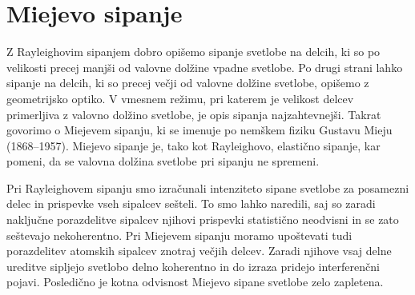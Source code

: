 % 

\section{Miejevo sipanje}
Z Rayleighovim sipanjem dobro opišemo sipanje svetlobe na delcih, ki so 
po velikosti precej manjši od valovne dolžine vpadne svetlobe. Po drugi strani lahko
sipanje na delcih, ki so precej večji od valovne dolžine svetlobe, opišemo
z geometrijsko optiko. V vmesnem režimu, pri katerem je velikost delcev 
primerljiva z valovno dolžino svetlobe, je opis sipanja najzahtevnejši.
Takrat govorimo o Miejevem sipanju, ki se imenuje po nemškem fiziku Gustavu 
Mieju (1868--1957). Miejevo sipanje je, 
tako kot Rayleighovo, elastično sipanje, kar pomeni, da se valovna dolžina svetlobe
pri sipanju ne spremeni.

Pri Rayleighovem sipanju smo izračunali intenziteto sipane svetlobe za posamezni
delec in prispevke vseh sipalcev sešteli. To smo lahko naredili, saj so 
zaradi naključne porazdelitve sipalcev njihovi prispevki 
statistično neodvisni in se zato seštevajo 
nekoherentno. Pri Miejevem sipanju moramo upoštevati tudi porazdelitev atomskih
sipalcev znotraj večjih delcev. Zaradi njihove vsaj delne ureditve sipljejo
svetlobo delno koherentno in do izraza pridejo interferenčni pojavi. Posledično
je kotna odvisnost Miejevo sipane svetlobe zelo zapletena. 

